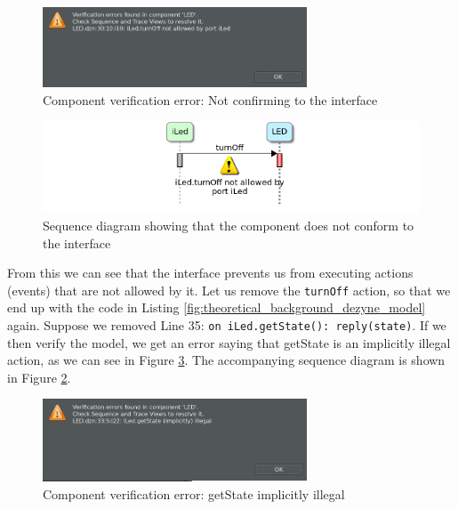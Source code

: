 \documentclass[12pt]{scrreprt}
\begin{document}
\begin{figure}[H]
    \centering
    \includegraphics[width=0.7\textwidth]{Figures/theoretical_background/led_verification_error.png}
    \caption{Component verification error: Not confirming to the interface}
    \label{Component verification error: Not confirming to the interface}
\end{figure}

\begin{figure}[H]
    \centering
    \includegraphics[width=\textwidth]{Figures/theoretical_background/verification_error_in_sequence_diagram.png}
    \caption{Sequence diagram showing that the component does not conform to the interface}
    \label{Sequence diagram showing that the component does not conform to the interface}
\end{figure}

From this we can see that the interface prevents us from executing actions (events) that are not allowed by it. Let us remove the \texttt{turnOff} action, so that we end up with the code in Listing \ref{fig:theoretical_background_dezyne_model} again. Suppose we removed Line 35: \texttt{on iLed.getState(): reply(state)}. If we then verify the model, we get an error saying that getState is an implicitly illegal action, as we can see in Figure \ref{Component verification error: getState implicitly illegal}. The accompanying sequence diagram is shown in Figure \ref{Sequence diagram showing that the component does not conform to the interface}.

\begin{figure}[H]
    \centering
    \includegraphics[width=0.7\textwidth]{Figures/theoretical_background/led_verfication_error_getState.png}
    \caption{Component verification error: getState implicitly illegal}
    \label{Component verification error: getState implicitly illegal}
\end{figure}
\end{document}
